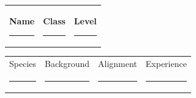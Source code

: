\documentclass[11pt,letterpaper]{article}
\begin{document}

\begin{tcolorbox}[sheetbox]

\begin{tabularx}{\linewidth}{XXX}

\textbf{Name}

\vspace{1em}

\rule{\linewidth}{0.4pt}

&
\textbf{Class}

\vspace{1em}

\rule{\linewidth}{0.4pt}

&
\textbf{Level}

\vspace{1em}

\rule{\linewidth}{0.4pt}

\end{tabularx}

\vspace{0.75em}

\begin{tabularx}{\linewidth}{XXXX}

Species &
Background &
Alignment &
Experience

\\

\rule{\linewidth}{0.4pt} &
\rule{\linewidth}{0.4pt} &
\rule{\linewidth}{0.4pt} &
\rule{\linewidth}{0.4pt}

\end{tabularx}

\end{tcolorbox}

\vspace{0.3cm}

\end{document}
